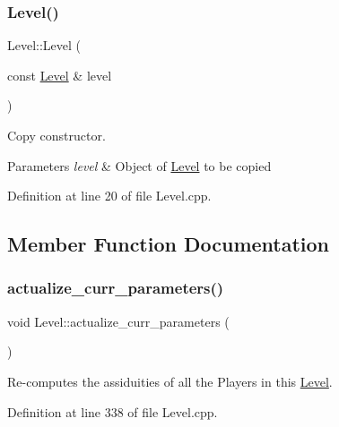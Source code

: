 \hypertarget{class_level_a098e3e980b18013bf7f0683acbe5e2f6}{}\label{class_level_a098e3e980b18013bf7f0683acbe5e2f6} 
\subsubsection{\texorpdfstring{Level()}{Level()}\hspace{0.1cm}{\footnotesize\ttfamily [2/2]}}
{\footnotesize\ttfamily Level\+::\+Level (\begin{DoxyParamCaption}\item[{const \hyperlink{class_level}{Level} \&}]{level }\end{DoxyParamCaption})}



Copy constructor. 


\begin{DoxyParams}{Parameters}
{\em level} & Object of \hyperlink{class_level}{Level} to be copied \\
\hline
\end{DoxyParams}


Definition at line 20 of file Level.\+cpp.



\subsection{Member Function Documentation}
\hypertarget{class_level_a09a28b62e9b593db54b220533a5dd567}{}\label{class_level_a09a28b62e9b593db54b220533a5dd567} 
\subsubsection{\texorpdfstring{actualize\+\_\+curr\+\_\+parameters()}{actualize\_curr\_parameters()}}
{\footnotesize\ttfamily void Level\+::actualize\+\_\+curr\+\_\+parameters (\begin{DoxyParamCaption}{ }\end{DoxyParamCaption})}



Re-\/computes the assiduities of all the Players in this \hyperlink{class_level}{Level}. 



Definition at line 338 of file Level.\+cpp.

